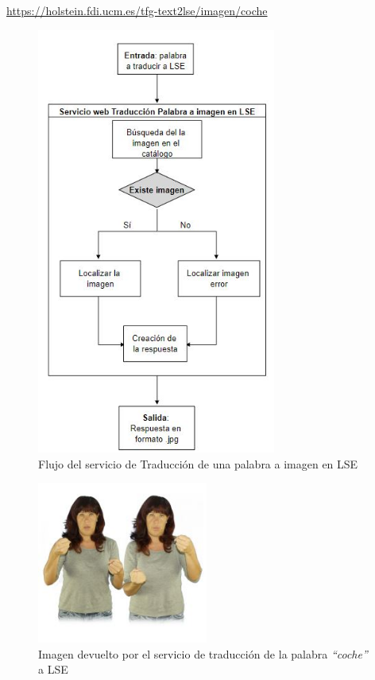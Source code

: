 \begin{shaded}
	\url{https://holstein.fdi.ucm.es/tfg-text2lse/imagen/coche }	
\end{shaded}


\begin{figure}[]
	\centering
	\includegraphics[width=0.7\textwidth]{Imagenes/Fuentes/Text2LSE/FlujoImagen1palabra.jpg}
	\caption{Flujo del servicio de Traducción de una palabra a imagen en LSE}
	\label {fig: imgFlujo1palabraImagenText2LSE}
\end{figure}

\begin{figure}[]
	\centering
	\includegraphics[width=0.5\textwidth]{Imagenes/Fuentes/Text2LSE/imagenEjemplo.jpg}
	\caption{Imagen devuelto por el servicio de traducción de la palabra \textit{``coche''} a LSE}
	\label {fig: imgCoche}
\end{figure}

